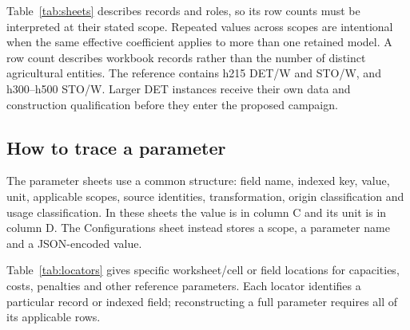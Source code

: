 \documentclass[11pt,a4paper]{article}
\begin{document}
Table~\ref{tab:sheets} describes records and roles, so its row counts must be interpreted at their stated scope. Repeated values across scopes are intentional when the same effective coefficient applies to more than one retained model. A row count describes workbook records rather than the number of distinct agricultural entities. The reference contains h215 DET/W and STO/W, and h300--h500 STO/W. Larger DET instances receive their own data and construction qualification before they enter the proposed campaign.

\subsection{How to trace a parameter}

The parameter sheets use a common structure: field name, indexed key, value, unit, applicable scopes, source identities, transformation, origin classification and usage classification. In these sheets the value is in column C and its unit is in column D. The Configurations sheet instead stores a scope, a parameter name and a JSON-encoded value.

Table~\ref{tab:locators} gives specific worksheet/cell or field locations for capacities, costs, penalties and other reference parameters. Each locator identifies a particular record or indexed field; reconstructing a full parameter requires all of its applicable rows.
\end{document}
